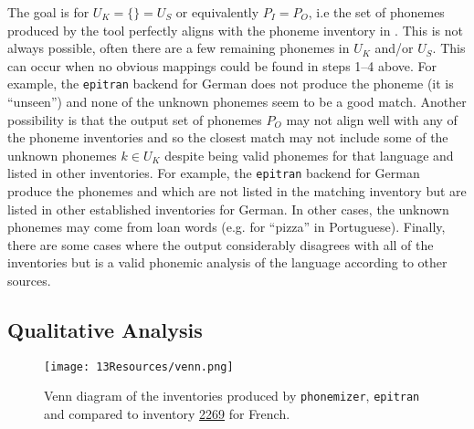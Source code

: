 The goal is for $U_K = \{\} = U_S$ or equivalently $P_I = P_O$, i.e the set of phonemes produced by the tool perfectly aligns with the phoneme inventory in \phoible. This is not always possible, often there are a few remaining phonemes in $U_K$ and/or $U_S$. This can occur when no obvious mappings could be found in steps 1--4 above. For example, the \texttt{epitran} backend for German does not produce the phoneme  (it is ``unseen'') and none of the unknown phonemes seem to be a good match. Another possibility is that the output set of phonemes $P_O$ may not align well with any of the \phoible phoneme inventories and so the closest match may not include some of the unknown phonemes $k \in U_K$ despite being valid phonemes for that language and listed in other inventories. For example, the \texttt{epitran} backend for German produce the phonemes  and  which are not listed in the matching inventory but are listed in other established inventories for German. In other cases, the unknown phonemes may come from loan words (e.g.  for ``pizza'' in Portuguese). Finally, there are some cases where the output considerably disagrees with all of the \phoible inventories but is a valid phonemic analysis of the language according to other sources.



\subsection{Qualitative Analysis}\label{sec:13-qualitative}


\begin{figure}[t]
    \centering
    \texttt{[image: 13Resources/venn.png]}
    \caption{Venn diagram of the inventories produced by \texttt{phonemizer}, \texttt{epitran} and \gpp compared to \phoible inventory \href{https://phoible.org/inventories/view/2269}{2269} for French.}
    \label{fig:13-venn}
\end{figure}

